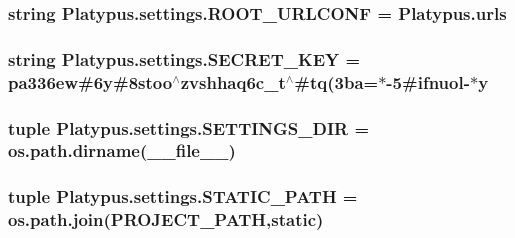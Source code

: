 \subsubsection[{R\+O\+O\+T\+\_\+\+U\+R\+L\+C\+O\+N\+F}]{\setlength{\rightskip}{0pt plus 5cm}string Platypus.\+settings.\+R\+O\+O\+T\+\_\+\+U\+R\+L\+C\+O\+N\+F = \textquotesingle{}Platypus.\+urls\textquotesingle{}}\label{namespace_platypus_1_1settings_a79c6cca950bb10c5d935bcba5682eeee}
\hypertarget{namespace_platypus_1_1settings_a6de75307b3f4b09382a818ec2e7bc731}{}
\subsubsection[{S\+E\+C\+R\+E\+T\+\_\+\+K\+E\+Y}]{\setlength{\rightskip}{0pt plus 5cm}string Platypus.\+settings.\+S\+E\+C\+R\+E\+T\+\_\+\+K\+E\+Y = \textquotesingle{}pa336ew\#6y\#8stoo$^\wedge$zvshhaq6c\+\_\+t$^\wedge$\#tq(3ba=$\ast$-\/5\#ifnuol-\/$\ast$y\textquotesingle{}}\label{namespace_platypus_1_1settings_a6de75307b3f4b09382a818ec2e7bc731}
\hypertarget{namespace_platypus_1_1settings_ae0eb1680d14f9e1e34ff29544b80a603}{}
\subsubsection[{S\+E\+T\+T\+I\+N\+G\+S\+\_\+\+D\+I\+R}]{\setlength{\rightskip}{0pt plus 5cm}tuple Platypus.\+settings.\+S\+E\+T\+T\+I\+N\+G\+S\+\_\+\+D\+I\+R = os.\+path.\+dirname(\+\_\+\+\_\+file\+\_\+\+\_\+)}\label{namespace_platypus_1_1settings_ae0eb1680d14f9e1e34ff29544b80a603}
\hypertarget{namespace_platypus_1_1settings_a4e4df2249902ab91d805e7b783222b14}{}
\subsubsection[{S\+T\+A\+T\+I\+C\+\_\+\+P\+A\+T\+H}]{\setlength{\rightskip}{0pt plus 5cm}tuple Platypus.\+settings.\+S\+T\+A\+T\+I\+C\+\_\+\+P\+A\+T\+H = os.\+path.\+join({\bf P\+R\+O\+J\+E\+C\+T\+\_\+\+P\+A\+T\+H},\textquotesingle{}static\textquotesingle{})}\label{namespace_platypus_1_1settings_a4e4df2249902ab91d805e7b783222b14}
\hypertarget{namespace_platypus_1_1settings_a6ccc40e5617a0f11b6912e3b69e8c0c1}{}
